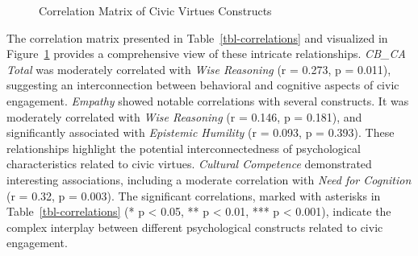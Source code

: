 \documentclass[
  man,
  floatsintext,
  longtable,
  nolmodern,
  notxfonts,
  notimes,
  colorlinks=true,linkcolor=blue,citecolor=blue,urlcolor=blue]{apa7}
\begin{document}
\begin{figure}

\caption{\label{fig-correlation-plot}Correlation Matrix of Civic Virtues
Constructs}


\end{figure}%

The correlation matrix presented in Table~\ref{tbl-correlations} and
visualized in Figure~\ref{fig-correlation-plot} provides a comprehensive
view of these intricate relationships. \emph{CB\_CA Total} was
moderately correlated with \emph{Wise Reasoning} (r = 0.273, p = 0.011),
suggesting an interconnection between behavioral and cognitive aspects
of civic engagement. \emph{Empathy} showed notable correlations with
several constructs. It was moderately correlated with \emph{Wise
Reasoning} (r = 0.146, p = 0.181), and significantly associated with
\emph{Epistemic Humility} (r = 0.093, p = 0.393). These relationships
highlight the potential interconnectedness of psychological
characteristics related to civic virtues. \emph{Cultural Competence}
demonstrated interesting associations, including a moderate correlation
with \emph{Need for Cognition} (r = 0.32, p = 0.003). The significant
correlations, marked with asterisks in Table~\ref{tbl-correlations} (* p
\textless{} 0.05, ** p \textless{} 0.01, *** p \textless{} 0.001),
indicate the complex interplay between different psychological
constructs related to civic engagement.
\end{document}
